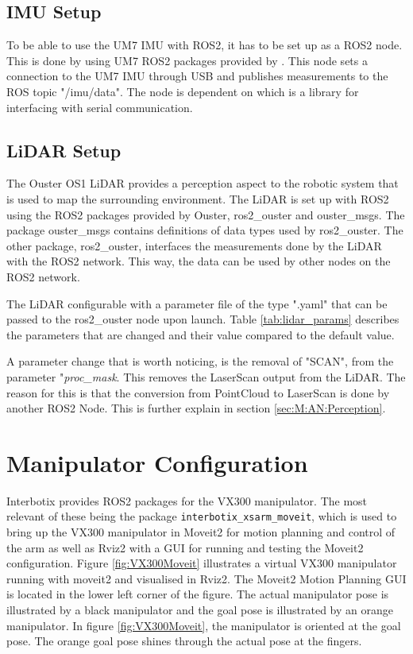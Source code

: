 \subsection{IMU Setup}
To be able to use the UM7 IMU with ROS2, it has to be set up as a ROS2 node. This is done by using UM7 ROS2 packages provided by \cite{um7_repo}. This node sets a connection to the UM7 IMU through USB and publishes measurements to the ROS topic "/imu/data". The node is dependent on \cite{serial_repo} which is a library for interfacing with serial communication.

\subsection{LiDAR Setup} \label{sec:M:MRC:LiDARSetup}
The Ouster OS1 LiDAR provides a perception aspect to the robotic system that is used to map the surrounding environment. The LiDAR is set up with ROS2 using the ROS2 packages provided by Ouster\cite{ouster_repo}, ros2\_ouster and ouster\_msgs. The package ouster\_msgs contains definitions of data types used by ros2\_ouster. The other package, ros2\_ouster, interfaces the measurements done by the LiDAR with the ROS2 network. This way, the data can be used by other nodes on the ROS2 network.

The LiDAR configurable with a parameter file of the type ".yaml" that can be passed to the ros2\_ouster node upon launch. Table \ref{tab:lidar_params} describes the parameters that are changed and their value compared to the default value.



A parameter change that is worth noticing, is the removal of "SCAN", from the parameter "\textit{proc\_mask}. This removes the LaserScan output from the LiDAR. The reason for this is that the conversion from PointCloud to LaserScan is done by another ROS2 Node. This is further explain in section \ref{sec:M:AN:Perception}.

\section{Manipulator Configuration}\label{sec:M:MRC:Manipulator}
Interbotix provides ROS2 packages for the VX300 manipulator. The most relevant of these being the package \lstinline{interbotix_xsarm_moveit}, which is used to bring up the VX300 manipulator in Moveit2 for motion planning and control of the arm as well as Rviz2 with a GUI for running and testing the Moveit2 configuration. Figure \ref{fig:VX300Moveit} illustrates a virtual VX300 manipulator running with moveit2 and visualised in Rviz2. The Moveit2 Motion Planning GUI is located in the lower left corner of the figure. The actual manipulator pose is illustrated by a black manipulator and the goal pose is illustrated by an orange manipulator. In figure \ref{fig:VX300Moveit}, the manipulator is oriented at the goal pose. The orange goal pose shines through the actual pose at the fingers.

